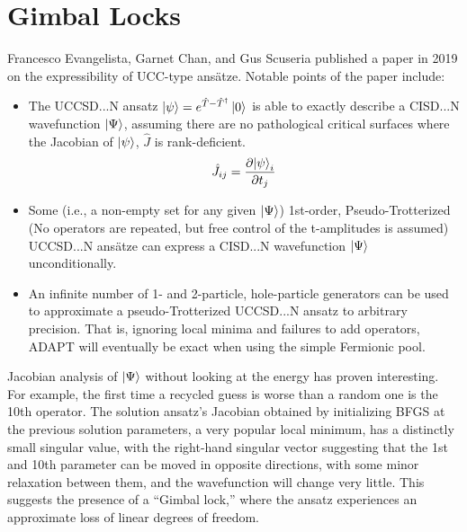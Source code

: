 \documentclass{article}
\begin{document}
\section{Gimbal Locks}
Francesco Evangelista, Garnet Chan, and Gus Scuseria published a paper in 2019 on the expressibility of UCC-type ans{\"a}tze.  Notable points of the paper include:
\begin{itemize}
\item The UCCSD...N ansatz $\ket{\psi} = e^{\hat{T}-\hat{T}^\dagger}\ket{0}$ is able to exactly describe a CISD...N wavefunction $\ket{\Psi}$, assuming there are no pathological critical surfaces where the Jacobian of $\ket{\psi}$, $\hat{J}$ is rank-deficient.
\begin{equation}
\hat{J}_{ij} = \frac{\partial{\ket{\psi}_i}}{\partial t_j}
\end{equation}
\item Some (i.e., a non-empty set for any given $\ket{\Psi}$) 1st-order, Pseudo-Trotterized (No operators are repeated, but free control of the t-amplitudes is assumed) UCCSD...N ans{\"a}tze can express a CISD...N wavefunction $\ket{\Psi}$ unconditionally.
\item An infinite number of 1- and 2-particle, hole-particle generators can be used to approximate a pseudo-Trotterized UCCSD...N ansatz to arbitrary precision. That is, ignoring local minima and failures to add operators, ADAPT will eventually be exact when using the simple Fermionic pool. 
\end{itemize}
Jacobian analysis of $\ket{\Psi}$ without looking at the energy has proven interesting.  For example, the first time a recycled guess is worse than a random one is the 10th operator.  The solution ansatz's Jacobian obtained by initializing BFGS at the previous solution parameters, a very popular local minimum, has a distinctly small singular value, with the right-hand singular vector suggesting that the 1st and 10th parameter can be moved in opposite directions, with some minor relaxation between them, and the wavefunction will change very little.  This suggests the presence of a ``Gimbal lock,'' where the ansatz experiences an approximate loss of linear degrees of freedom. 
\end{document}
